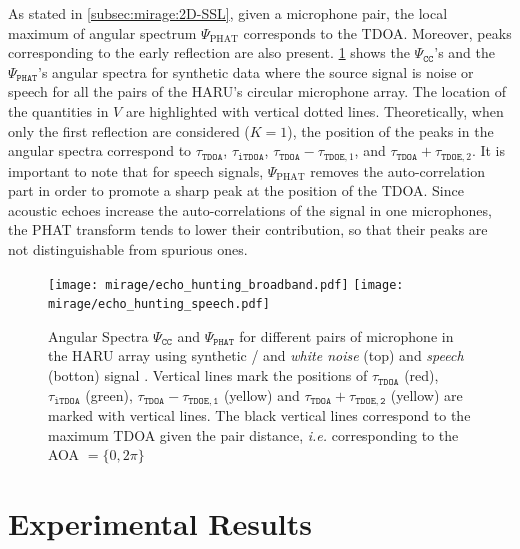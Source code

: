 \mynewline
As stated in \cref{subsec:mirage:2D-SSL}, given a microphone pair, the local maximum of angular spectrum $\Psi_\text{PHAT}$ corresponds to the \ac{TDOA}.
Moreover, peaks corresponding to the early reflection are also present.
\cref{fig:mirage:noise_ang_spec} shows the $\Psi_\mathtt{CC}$'s and the $\Psi_\mathtt{PHAT}$'s angular spectra for synthetic data where the source signal is noise or speech for all the pairs of the HARU's circular microphone array.
The location of the quantities in $V$ are highlighted with vertical dotted lines.
Theoretically, when only the first reflection are considered ($K=1$), the position of the peaks in the angular spectra correspond to
$\tau_\mathtt{TDOA}$, $\tau_\mathtt{iTDOA}$, $\tau_\mathtt{TDOA} - \tau_{\mathtt{TDOE}, 1}$, and $\tau_\mathtt{TDOA} + \tau_{\mathtt{TDOE}, 2}$.
It is important to note that for speech signals, $\Psi_\text{PHAT}$ removes the auto-correlation part in order to promote a sharp peak at the position of the \ac{TDOA}.
Since acoustic echoes increase the auto-correlations of the signal in one microphones, the \acs{PHAT} transform tends to lower their contribution, so that their peaks are not distinguishable from spurious ones.
\begin{figure}
    \begin{fullwidth}
        \centering
        \texttt{[image: mirage/echo\_hunting\_broadband.pdf]}
        \texttt{[image: mirage/echo\_hunting\_speech.pdf]}
        \caption{
            Angular Spectra $\Psi_\mathtt{CC}$ and $\Psi_\texttt{PHAT}$ for different pairs of microphone in the HARU array using synthetic \RIRs/ and \textit{white noise} (top) and \textit{speech} (botton) signal .
            Vertical lines mark the positions of  $\tau_\mathtt{TDOA}$ (red), $\tau_\mathtt{iTDOA}$ (green), $\tau_\mathtt{TDOA}-\tau_\mathtt{TDOE,1}$ (yellow) and $\tau_\mathtt{TDOA}+\tau_\mathtt{TDOE,2}$ (yellow) are marked with vertical lines.
            The black vertical lines correspond to the maximum TDOA given the pair distance, \textit{i.e.} corresponding to the AOA $ = \{0, 2\pi\}$}
        \label{fig:mirage:noise_ang_spec}
    \end{fullwidth}
\end{figure}


\section{Experimental Results}\label{sec:mirage:exp}

